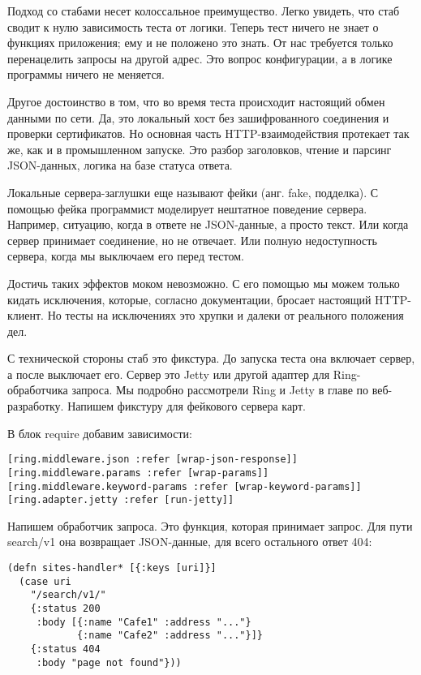 Подход со стабами несет колоссальное преимущество. Легко увидеть, что стаб
сводит к нулю зависимость теста от логики. Теперь тест ничего не знает о
функциях приложения; ему и не положено это знать. От нас требуется только
перенацелить запросы на другой адрес. Это вопрос конфигурации, а в логике
программы ничего не меняется.

Другое достоинство в том, что во время теста происходит настоящий обмен данными
по сети. Да, это локальный хост без зашифрованного соединения и проверки
сертификатов. Но основная часть HTTP-взаимодействия протекает так же, как и в
промышленном запуске. Это разбор заголовков, чтение и парсинг JSON-данных,
логика на базе статуса ответа.

Локальные сервера-заглушки еще называют фейки (анг. fake, подделка). С помощью
фейка программист моделирует нештатное поведение сервера. Например, ситуацию,
когда в ответе не JSON-данные, а просто текст. Или когда сервер принимает
соединение, но не отвечает. Или полную недоступность сервера, когда мы выключаем
его перед тестом.

Достичь таких эффектов моком невозможно. С его помощью мы можем только кидать
исключения, которые, согласно документации, бросает настоящий HTTP-клиент. Но
тесты на исключениях это хрупки и далеки от реального положения дел.

С технической стороны стаб это фикстура. До запуска теста она включает сервер, а
после выключает его. Сервер это Jetty или другой адаптер для Ring-обработчика
запроса. Мы подробно рассмотрели Ring и Jetty в главе по веб-разработку. Напишем
фикстуру для фейкового сервера карт.

В блок require добавим зависимости:

\begin{verbatim}
[ring.middleware.json :refer [wrap-json-response]]
[ring.middleware.params :refer [wrap-params]]
[ring.middleware.keyword-params :refer [wrap-keyword-params]]
[ring.adapter.jetty :refer [run-jetty]]
\end{verbatim}

Напишем обработчик запроса. Это функция, которая принимает запрос. Для пути
search/v1 она возвращает JSON-данные, для всего остального ответ 404:

\begin{verbatim}
(defn sites-handler* [{:keys [uri]}]
  (case uri
    "/search/v1/"
    {:status 200
     :body [{:name "Cafe1" :address "..."}
            {:name "Cafe2" :address "..."}]}
    {:status 404
     :body "page not found"}))
\end{verbatim}

